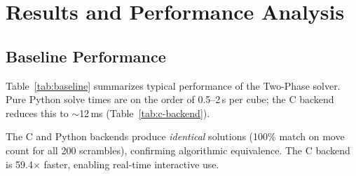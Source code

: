 \documentclass[conference]{IEEEtran}
\begin{document}
\FloatBarrier
\section{Results and Performance Analysis}
\label{sec:results}

\subsection{Baseline Performance}
Table~\ref{tab:baseline} summarizes typical performance of the Two-Phase solver. Pure Python solve times are on the order of 0.5--2\,s per cube; the C backend reduces this to $\sim$12\,ms (Table~\ref{tab:c-backend}).

\begin{table}[htbp]
\centering
\caption{C backend vs.\ Python backend on 200 identical scrambles (seed 42, $K{=}1$).}
\label{tab:c-backend}
\end{table}

The C and Python backends produce \emph{identical} solutions (100\% match on move count for all 200 scrambles), confirming algorithmic equivalence. The C backend is 59.4$\times$ faster, enabling real-time interactive use.

\begin{table}[htbp]
\centering
\caption{Typical performance of the Two-Phase solver.}
\label{tab:baseline}
\end{table}
\end{document}
